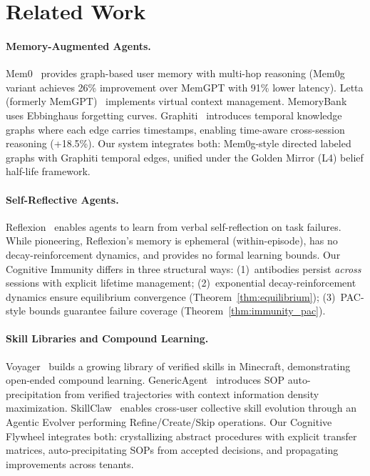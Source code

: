\documentclass[11pt,a4paper]{article}
\begin{document}
\section{Related Work}

\paragraph{Memory-Augmented Agents.}
Mem0~\cite{mem0} provides graph-based user memory with multi-hop reasoning
(Mem0g variant achieves 26\% improvement over MemGPT with 91\% lower latency).
Letta (formerly MemGPT)~\cite{letta} implements virtual context management.
MemoryBank~\cite{memorybank} uses Ebbinghaus forgetting curves.
Graphiti~\cite{graphiti} introduces temporal knowledge graphs where each edge
carries timestamps, enabling time-aware cross-session reasoning (+18.5\%).
Our system integrates both: Mem0g-style directed labeled graphs with
Graphiti temporal edges, unified under the Golden Mirror (L4) belief
half-life framework.

\paragraph{Self-Reflective Agents.}
Reflexion~\cite{reflexion} enables agents to learn from verbal self-reflection
on task failures. While pioneering, Reflexion's memory is ephemeral
(within-episode), has no decay-reinforcement dynamics, and provides no formal
learning bounds. Our Cognitive Immunity differs in three structural ways:
(1)~antibodies persist \emph{across} sessions with explicit lifetime management;
(2)~exponential decay-reinforcement dynamics ensure equilibrium convergence
(Theorem~\ref{thm:equilibrium});
(3)~PAC-style bounds guarantee failure coverage
(Theorem~\ref{thm:immunity_pac}).

\paragraph{Skill Libraries and Compound Learning.}
Voyager~\cite{voyager} builds a growing library of verified skills in
Minecraft, demonstrating open-ended compound learning.
GenericAgent~\cite{genericagent} introduces SOP auto-precipitation from
verified trajectories with context information density maximization.
SkillClaw~\cite{skillclaw} enables cross-user collective skill evolution
through an Agentic Evolver performing Refine/Create/Skip operations.
Our Cognitive Flywheel integrates both: crystallizing abstract procedures
with explicit transfer matrices, auto-precipitating SOPs from accepted
decisions, and propagating improvements across tenants.
\end{document}
